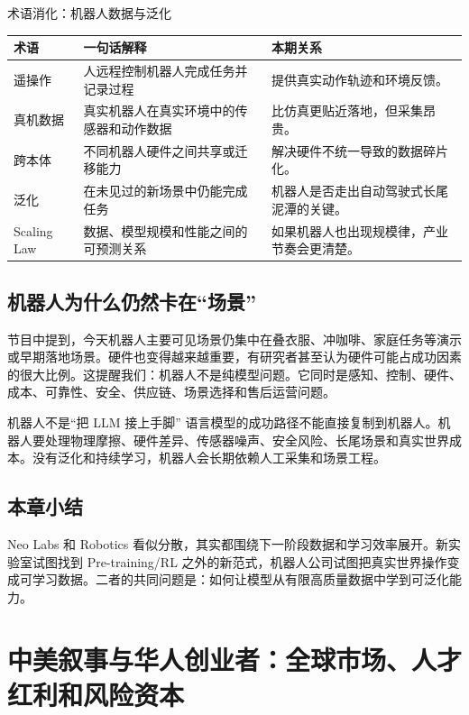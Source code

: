 \documentclass[a4paper]{article}
\begin{document}
\begin{knowledgebox}{术语消化：机器人数据与泛化}
\begin{tabularx}{\textwidth}{p{}p{}X}
\toprule
术语 & 一句话解释 & 本期关系 \\
\midrule
遥操作 & 人远程控制机器人完成任务并记录过程 & 提供真实动作轨迹和环境反馈。 \\
真机数据 & 真实机器人在真实环境中的传感器和动作数据 & 比仿真更贴近落地，但采集昂贵。 \\
跨本体 & 不同机器人硬件之间共享或迁移能力 & 解决硬件不统一导致的数据碎片化。 \\
泛化 & 在未见过的新场景中仍能完成任务 & 机器人是否走出自动驾驶式长尾泥潭的关键。 \\
Scaling Law & 数据、模型规模和性能之间的可预测关系 & 如果机器人也出现规模律，产业节奏会更清楚。 \\
\bottomrule
\end{tabularx}
\end{knowledgebox}

\subsection{机器人为什么仍然卡在“场景”}

节目中提到，今天机器人主要可见场景仍集中在叠衣服、冲咖啡、家庭任务等演示或早期落地场景。硬件也变得越来越重要，有研究者甚至认为硬件可能占成功因素的很大比例。这提醒我们：机器人不是纯模型问题。它同时是感知、控制、硬件、成本、可靠性、安全、供应链、场景选择和售后运营问题。

\begin{warningbox}{机器人不是“把 LLM 接上手脚”}
语言模型的成功路径不能直接复制到机器人。机器人要处理物理摩擦、硬件差异、传感器噪声、安全风险、长尾场景和真实世界成本。没有泛化和持续学习，机器人会长期依赖人工采集和场景工程。
\end{warningbox}

\subsection{本章小结}

Neo Labs 和 Robotics 看似分散，其实都围绕下一阶段数据和学习效率展开。新实验室试图找到 Pre-training/RL 之外的新范式，机器人公司试图把真实世界操作变成可学习数据。二者的共同问题是：如何让模型从有限高质量数据中学到可泛化能力。

\section{中美叙事与华人创业者：全球市场、人才红利和风险资本}
\end{document}
